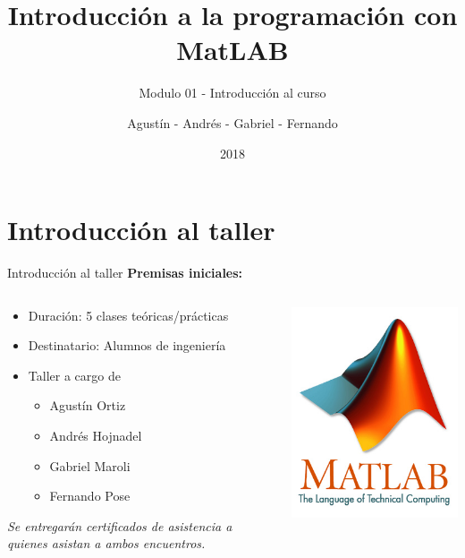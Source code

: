 \documentclass{bredelebeamer}
\title[Programación en MatLAB]{Introducción a la programación con MatLAB}
\subtitle{Modulo 01 - Introducción al curso}
\author{Agustín - Andrés - Gabriel - Fernando\inst{1}}
\institute[UTN.BA]
{
  \inst{1}%
  Universidad Tecnológica Nacional\\
  Facultad Regional Buenos Aires
  }
\date{2018}
\begin{document}
\begin{frame}
  \titlepage 
\end{frame}



\section{Introducción al taller}

\begin{frame}{Introducción al taller}
\textbf{Premisas iniciales:}
\begin{columns}
\begin{column}{0.5\textwidth}
\begin{itemize}
\item Duración: 5 clases teóricas/prácticas
\item Destinatario: Alumnos de ingeniería
\item Taller a cargo de
\begin{itemize}
\item Agustín Ortiz
\item Andrés Hojnadel
\item Gabriel Maroli
\item Fernando Pose
\end{itemize}
\end{itemize}
\begin{center}
\textit{Se entregarán certificados de asistencia a quienes asistan a ambos encuentros.
}\end{center}
\end{column}
\begin{column}{0.3\textwidth}
\includegraphics[scale=0.3]{images/matlab.jpg}
\end{column}
\end{columns}
\end{frame}
\end{document}
